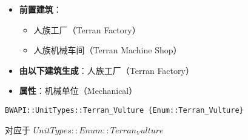\begin{tcolorbox}[colback=white, colframe=black!60!white, title=Terran\_Siege\_Tank\_Tank\_Mode(), arc=0mm]
\begin{itemize}
\begin{itemize}
            \end{itemize}
        \item \textbf{前置建筑}：
            \begin{itemize}
                \item 人族工厂（Terran Factory）
                \item 人族机械车间（Terran Machine Shop）
            \end{itemize}
        \item \textbf{由以下建筑生成}：人族工厂（Terran Factory）
        \item \textbf{属性}：机械单位（Mechanical）
    \end{itemize}
\end{tcolorbox}

\begin{tcolorbox}[colback=white, colframe=black!60!white, title=Terran\_Vulture(), arc=0mm]
    \begin{verbatim}
BWAPI::UnitTypes::Terran_Vulture {Enum::Terran_Vulture}
    \end{verbatim}
    对应于  $ UnitTypes::Enum::Terran_Vulture $ 
    

\end{tcolorbox}
